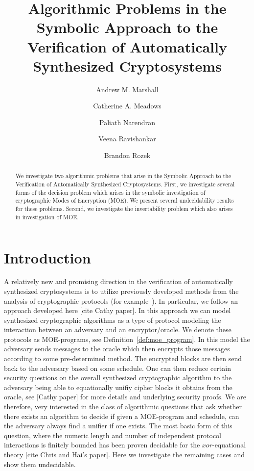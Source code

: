 \documentclass{easychair}
\title{Algorithmic Problems in the Symbolic Approach to the Verification of Automatically Synthesized Cryptosystems}
\author{Andrew M. Marshall \inst{1} 
	\and Catherine A. Meadows \inst{2} 
	\and Paliath Narendran \inst{3} 
	\and Veena Ravishankar \inst{1} 
	\and Brandon Rozek \inst{4} }
\institute{University of Mary Washington, Fredericksburg, VA, USA
	\and Naval Research Laboratory, Washington, DC, USA
	\and University at Albany--SUNY, Albany, NY, USA 
	\and Naval Surface Warfare Center Dahlgren Division, Dahlgren, VA, USA}
\begin{document}
\maketitle
\begin{abstract}
We investigate two algorithmic problems that arise in the Symbolic Approach to the Verification of Automatically Synthesized Cryptosystems. First, we investigate several forms of
the decision problem which arises in the symbolic investigation 
of cryptographic Modes of Encryption (MOE). We present several
undecidability results for these problems. Second, we investigate
the invertability problem which also arises in investigation of
MOE.    

\end{abstract}



\section{Introduction}
A relatively new and promising direction in the verification of
automatically synthesized cryptosystems is to utilize previously developed methods from the analysis of cryptographic protocols 
(for example~\cite{malozemoff2014automated}).
In particular, we follow an approach developed here [cite Cathy paper].
In this approach we can model synthesized cryptographic algorithms
as a type of protocol modeling the interaction between an adversary
and an encryptor/oracle. We denote these protocols as 
MOE-programs, see Definition~\ref{def:moe_program}.
In this model the adversary sends messages to the oracle which then 
encrypts those messages according to some pre-determined 
method. The encrypted blocks are then send back to the adversary 
based on some schedule. One can then reduce certain security
questions on the overall synthesized cryptographic algorithm to
the adversary being able to equationally unifiy cipher blocks
it obtains from the oracle, see [Cathy paper] for more details
and underlying security proofs. We are therefore, very interested 
in the class of algorithmic questions that ask whether there exists
an algorithm to decide if given a MOE-program and schedule, can
the adversary always find a unifier if one exists. The most basic form
of this question, where the numeric length and number of independent protocol 
interactions is finitely bounded has been proven decidable for the
$xor$-equational theory [cite Chris and Hai's paper]. 
Here we investigate the remaining cases and show them undecidable.
\end{document}
